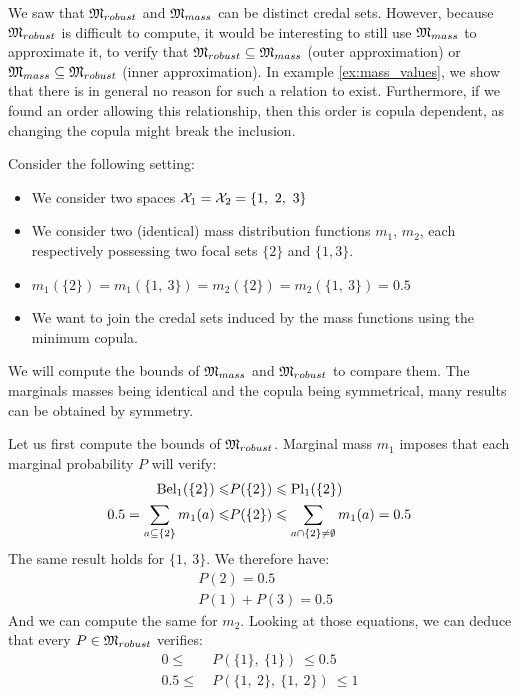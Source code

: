 We saw that ${\mathfrak{M}}_{robust}$ and ${\mathfrak{M}}_{mass}$ can be distinct credal sets. However, because ${\mathfrak{M}}_{robust}$ is difficult to compute, it would be interesting to still use ${\mathfrak{M}}_{mass}$ to approximate it, \ie to verify that ${\mathfrak{M}}_{robust}\subseteq{\mathfrak{M}}_{mass}$ (outer approximation) or ${\mathfrak{M}}_{mass}\subseteq{\mathfrak{M}}_{robust}$ (inner approximation). In example \ref{ex:mass_values}, we show that there is in general no reason for such a relation to exist. Furthermore, if we found an order allowing this relationship, then this order is copula dependent, as changing the copula might break the inclusion. 
\begin{example}\label{ex:mass_values}
    Consider the following setting:
    \begin{itemize}
        \item We consider two spaces ${\mathcal{X}}_1={\mathcal{X}}_2=\{1,~2,~3\}$
        \item We consider two (identical) mass distribution functions $m_1$, $m_2$, each respectively possessing two focal sets $\{2\}$ and $\{1,3\}$.
        \item $m_1(\{2\}) = m_1(\{1,~3\}) = m_2(\{2\})= m_2(\{1,~3\}) = 0.5$
        \item We want to join the credal sets induced by the mass functions using the minimum copula.
    \end{itemize}
    We will compute the bounds of ${\mathfrak{M}}_{mass}$ and ${\mathfrak{M}}_{robust}$ to compare them. The marginals masses being identical and the copula being symmetrical, many results can be obtained by symmetry.
    
    Let us first compute the bounds of ${\mathfrak{M}}_{robust}$. Marginal mass $m_1$ imposes that each marginal probability $P$ will verify:
    \begin{align*}
        {\mathrm{Bel}}_1(\{2\}) \leqslant &P(\{2\}) \leqslant {\mathrm{Pl}}_1(\{2\})\\
        0.5 = \sum_{a\subseteq\{2\}}m_1(a) \leqslant &P(\{2\}) \leqslant \sum_{a\cap\{2\}\neq\emptyset}m_1(a) = 0.5
    \end{align*}
    The same result holds for $\{1,~3\}$. We therefore have:
    \begin{align*}
        &P(2)=0.5\\
        &P(1)+P(3)=0.5
    \end{align*}
    And we can compute the same for $m_2$. Looking at those equations, we can deduce that every $P\in{\mathfrak{M}}_{robust}$ verifies:
    \begin{align*}
        0 \leqslant ~&P(\{1\},~ \{1\}) ~\leqslant 0.5\\
        0.5 \leqslant ~&P(\{1, ~2\},~ \{1, ~2\}) ~\leqslant 1
    \end{align*}
    

\end{example}
